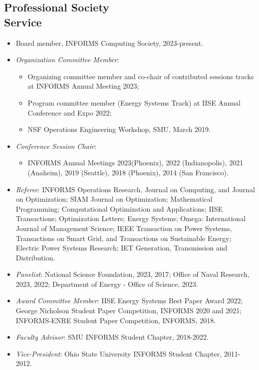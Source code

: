 \documentclass[hyperref, margin]{myResume}
\begin{document}
\begin{resume}
\section{Professional Society\\Service}
	\begin{itemize}[leftmargin=*]
		\item Board member, INFORMS Computing Society, 2023-present. 
		\item {\it Organization Committee Member}: 
		\begin{itemize}
			\item Organizing committee member and co-chair of contributed sessions tracks at INFORMS Annual Meeting 2023;
			\item Program committee member (Energy Systems Track) at IISE Annual Conference and Expo 2022;
			\item NSF Operations Engineering Workshop, SMU, March 2019.
		\end{itemize}
		\item \textit{Conference Session Chair}: 
		\begin{itemize}
			\item INFORMS Annual Meetings 2023(Phoenix), 2022 (Indianopolis), 2021 (Anaheim), 2019 (Seattle), 2018 (Phoenix), 2014 (San Francisco). 
		\end{itemize}
		\item \textit{Referee}: INFORMS Operations Research, Journal on Computing, and Journal on Optimization; SIAM Journal on Optimization; Mathematical Programming; Computational Optimization and Applications; IISE Transactions; Optimization Letters; Energy Systems; Omega: International Journal of Management Science; IEEE Transaction on Power Systems, Transactions on Smart Grid, and Transactions on Sustainable Energy; Electric Power Systems Research; IET Generation, Transmission and Distribution.
		\item {\it Panelist}: National Science Foundation, 2023, 2017; Office of Naval Research, 2023, 2022; Department of Energy - Office of Science, 2023.
		\item {\it Award Committee Member}: IISE Energy Systems Best Paper Award 2022; George Nicholson Student Paper Competition, INFORMS 2020 and 2021; INFORMS-ENRE Student Paper Competition, INFORMS, 2018.
		\item {\it Faculty Advisor}: SMU INFORMS Student Chapter, 2018-2022.
		\item \textit{Vice-President}: Ohio State University INFORMS Student Chapter, 2011-2012.
	\end{itemize}
	

\end{resume}
\end{document}
